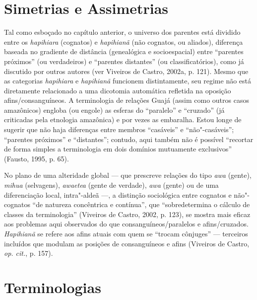 \section{Simetrias e Assimetrias }\label{simetrias-e-assimetrias}

Tal como esboçado no capítulo anterior, o universo dos parentes está
dividido entre os \emph{hapihiara} (cognatos) e \emph{hapihianã} (não
cognatos, ou aliados), diferença baseada no gradiente de distância
(genealógica e socioespacial) entre ``parentes próximos'' (ou
verdadeiros) e ``parentes distantes'' (ou classificatórios), como já
discutido por outros autores (ver Viveiros de Castro, 2002a, p. 121).
Mesmo que as categorias \emph{hapihiara} e \emph{hapihianã} funcionem
distintamente, seu regime não está diretamente relacionado a uma
dicotomia automática refletida na oposição afins/consanguíneos. A
terminologia de relações Guajá (assim como outros casos amazônicos)
engloba (ou engole) as esferas do ``paralelo'' e ``cruzado'' (já criticadas
pela etnologia amazônica) e por vezes as embaralha. Estou longe de
sugerir que não haja diferenças entre membros ``casáveis'' e
``não"-casáveis''; ``parentes próximos'' e ``distantes''; contudo, aqui
também não é possível ``recortar de forma simples a terminologia em dois
domínios mutuamente exclusivos'' (Fausto, 1995, p. 65).

No plano de uma alteridade global --- que prescreve relações do tipo
\emph{awa} (gente), \emph{mihua} (selvagens), \emph{awaetea} (gente de
verdade), \emph{awa} (gente) ou de uma diferenciação local,
intra"-aldeã ---, a distinção sociológica entre cognatos e não"-cognatos ``de
natureza concêntrica e contínua'', que ``sobredetermina o cálculo de
classes da terminologia'' (Viveiros de Castro, 2002, p. 123), se mostra
mais eficaz aos problemas aqui observados do que consanguíneos/paralelos
e afins/cruzados. \emph{Hapihianã} se refere aos afins atuais com quem
se ``trocam cônjuges'' --- terceiros incluídos que modulam as posições de
consanguíneos e afins (Viveiros de Castro, \emph{op. cit.}, p. 157).

\section{Terminologias}

